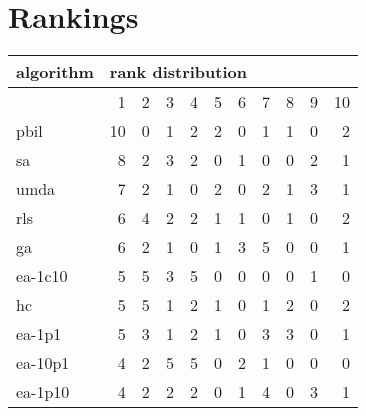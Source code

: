 \graphicspath{{../graphics/}}

\section{Rankings}
\begin{center}
\begin{tabular}{@{}l*{10}{r}@{}}
\toprule
algorithm & \multicolumn{10}{l}{{rank distribution}}\\
\midrule
& 1 & 2 & 3 & 4 & 5 & 6 & 7 & 8 & 9 & 10\\
\midrule
pbil & 10 & 0 & 1 & 2 & 2 & 0 & 1 & 1 & 0 & 2\\
sa & 8 & 2 & 3 & 2 & 0 & 1 & 0 & 0 & 2 & 1\\
umda & 7 & 2 & 1 & 0 & 2 & 0 & 2 & 1 & 3 & 1\\
rls & 6 & 4 & 2 & 2 & 1 & 1 & 0 & 1 & 0 & 2\\
ga & 6 & 2 & 1 & 0 & 1 & 3 & 5 & 0 & 0 & 1\\
ea-1c10 & 5 & 5 & 3 & 5 & 0 & 0 & 0 & 0 & 1 & 0\\
hc & 5 & 5 & 1 & 2 & 1 & 0 & 1 & 2 & 0 & 2\\
ea-1p1 & 5 & 3 & 1 & 2 & 1 & 0 & 3 & 3 & 0 & 1\\
ea-10p1 & 4 & 2 & 5 & 5 & 0 & 2 & 1 & 0 & 0 & 0\\
ea-1p10 & 4 & 2 & 2 & 2 & 0 & 1 & 4 & 0 & 3 & 1\\
\bottomrule
\end{tabular}
\end{center}

\newpage

